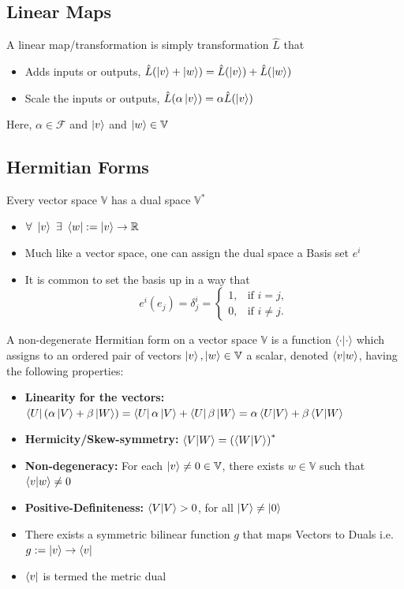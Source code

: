 \subsection{Linear Maps}
A linear map/transformation is simply transformation $\hat{L}$ that
		\begin{itemize}
				\item Adds inputs or outputs, $\hat{L}(\ket{v} + \ket{w}) = \hat{L}(\ket{v}) + \hat{L}(\ket{w})$
			\item Scale the inputs or outputs, $\hat{L}(\alpha \ket{v}) = \alpha \hat{L}(\ket{v})$
		\end{itemize}
		Here, $\alpha  \in \mathcal{F}$ and $\ket{v} $ and $\ket{w} \in \mathbb{V}$
\subsection{Hermitian Forms}
Every vector space $\mathbb{V}$ has a dual space $\mathbb{V}^{*}$
\begin{itemize}
\item $\forall \ \ket{v} \ \exists \ \bra{w} := \ket{v} \rightarrow \mathbb{R}$
\item Much like a vector space, one can assign the dual space a Basis set $e^{i}$
\item It is common to set the basis up in a way that $$e^{i}(e_{j}) = \delta^{i}_{j} = \begin{cases}            1, &         \text{if } i=j,\\
            0, &         \text{if } i\neq j.
    \end{cases}$$
\end{itemize}
A non-degenerate Hermitian form on a vector space $\mathbb{V}$ is a function
$\langle \cdot | \cdot \rangle$ which assigns to an ordered pair of vectors $\ket{v}, \ket{w} \in \mathbb{V}$ a scalar, denoted $\braket{v}{w}$,
having the following properties:
\begin{itemize}
    \item \textbf{Linearity for the vectors:} $\bra{U}(\alpha\ket{V}+\beta\ket{W}) = \bra{U}\alpha\ket{V} + \bra{U}\beta\ket{W} = \alpha\braket{U}{V} + \beta\braket{V}{W}$
    \item \textbf{Hermicity/Skew-symmetry:} $\braket{V}{W} = {(\braket{W}{V})}^{*}$
    \item \textbf{Non-degeneracy:} For each $\ket{v} \neq 0 \in \mathbb{V}$, there exists $w \in \mathbb{V}$ such that $\braket{v}{w} \neq 0$
    \item \textbf{Positive-Definiteness:} $\braket{V}{V} > 0$, for all $\ket{V} \neq \ket{0}$
\end{itemize}
\begin{itemize}
    \item There exists a symmetric bilinear function $g$ that maps Vectors to Duals i.e. $g : = \ket{v} \rightarrow \bra{v}$
    \item $\bra{v}$ is termed the metric dual
\end{itemize}

